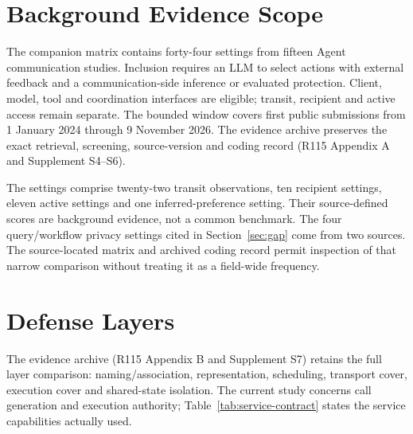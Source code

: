 \appendices
\section{Background Evidence Scope}\label{app:map}
The companion matrix contains forty-four settings from fifteen Agent communication studies. Inclusion requires an LLM to select actions with external feedback and a communication-side inference or evaluated protection. Client, model, tool and coordination interfaces are eligible; transit, recipient and active access remain separate. The bounded window covers first public submissions from 1 January 2024 through 9 November 2026. The evidence archive preserves the exact retrieval, screening, source-version and coding record (R115 Appendix A and Supplement S4--S6).

The settings comprise twenty-two transit observations, ten recipient settings, eleven active settings and one inferred-preference setting. Their source-defined scores are background evidence, not a common benchmark. The four query/workflow privacy settings cited in Section~\ref{sec:gap} come from two sources. The source-located matrix and archived coding record permit inspection of that narrow comparison without treating it as a field-wide frequency.

\section{Defense Layers}\label{app:defense}
The evidence archive (R115 Appendix B and Supplement S7) retains the full layer comparison: naming/association, representation, scheduling, transport cover, execution cover and shared-state isolation. The current study concerns call generation and execution authority; Table~\ref{tab:service-contract} states the service capabilities actually used.
